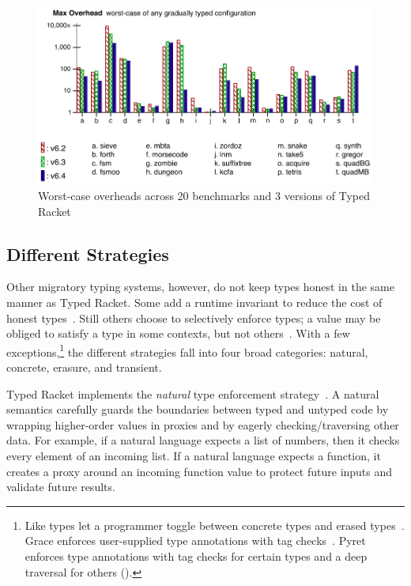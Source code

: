 \begin{figure}[h]
  \includegraphics[width=0.8\columnwidth]{src/jfp-2019-max.png}
  \caption{Worst-case overheads across 20 benchmarks and 3 versions of Typed Racket~\cite{gtnffvf-jfp-2019}}
  \label{fig:max-overhead}
\end{figure}


\subsection{Different Strategies}

Other migratory typing systems, however, do not keep types honest in the
 same manner as Typed Racket.
Some add a runtime invariant to reduce the cost of honest types~\cite{wnlov-popl-2010,bmt-ecoop-2010,mt-oopsla-2017}.
Still others choose to selectively enforce types; a value may be obliged to
 satisfy a type in some contexts, but not others~\cite{vss-popl-2017}.
With a few exceptions,\footnote{Like types
 let a programmer toggle between concrete types and erased types~\cite{wnlov-popl-2010,rzv-ecoop-2015}.
 Grace enforces user-supplied type annotations with tag checks~\cite{rmhn-ecoop-2019}.
 Pyret enforces type annotations with tag checks
  for certain types and a deep traversal for others ().}
 the different strategies fall into four broad categories:
 natural, concrete, erasure, and transient.

Typed Racket implements the \emph{natural}\/ type enforcement
 strategy~\cite{mf-toplas-2009,tf-popl-2008}.
A natural semantics carefully guards the boundaries between typed and untyped
 code by wrapping higher-order values in proxies and by eagerly
 checking/traversing other data.
For example, if a natural language expects a list of numbers, then it
 checks every element of an incoming list.
If a natural language expects a function, it creates a proxy around an incoming
 function value to protect future inputs and validate future results.

